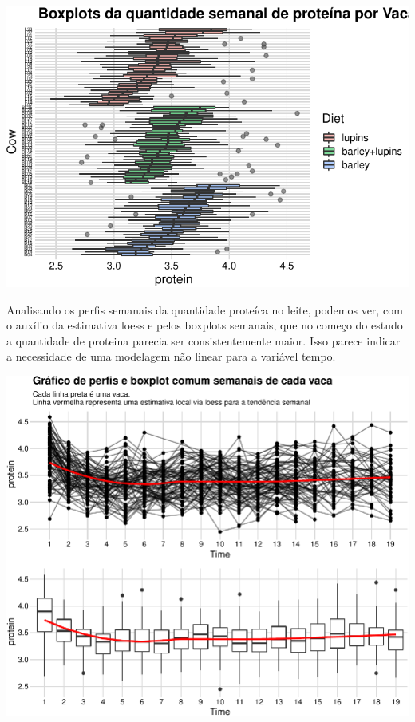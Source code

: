 \documentclass[
  11pt,
]{article}
\begin{document}
\begin{center}\includegraphics{lista3_files/figure-latex/unnamed-chunk-23-1} \end{center}

Analisando os perfis semanais da quantidade proteíca no leite, podemos ver, com o auxílio da estimativa loess e pelos boxplots semanais, que no começo do estudo a quantidade de proteina parecia ser consistentemente maior. Isso parece indicar a necessidade de uma modelagem não linear para a variável tempo.

\begin{center}\includegraphics{lista3_files/figure-latex/unnamed-chunk-24-1} \end{center}
\end{document}

